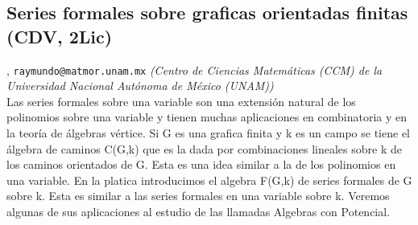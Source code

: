 \subsection{\sffamily Series formales sobre graficas orientadas finitas {\footnotesize (CDV, 2Lic)}} \label{reg-321} 
, {\tt raymundo@matmor.unam.mx}  {\slshape (Centro de Ciencias Matem\'aticas (CCM) de la Universidad Nacional Aut\'onoma de M\'exico (UNAM))}\\
          \noindent Las series formales sobre una variable son una extensi\'on natural de los polinomios sobre una variable y tienen muchas aplicaciones en combinatoria y en la teor\'ia de \'algebras v\'ertice. Si G es una grafica finita y k es un campo se tiene el \'algebra de caminos C(G,k) que es la dada por combinaciones lineales sobre k de los caminos orientados de G. Esta es una idea similar a la de los polinomios en una variable. En la platica introducimos el algebra F(G,k) de series formales de G sobre k. Esta es similar a las series formales en una variable sobre k. Veremos algunas de sus aplicaciones al estudio de las llamadas Algebras con Potencial.
